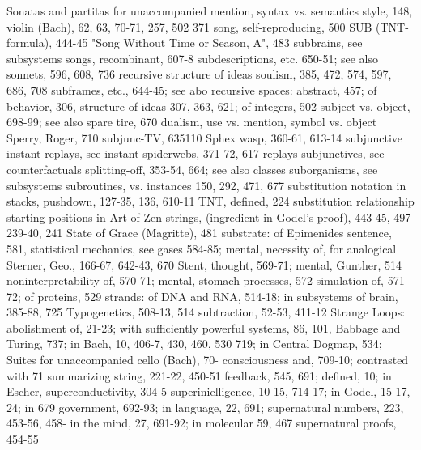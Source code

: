 Sonatas and partitas for unaccompanied          mention, syntax vs. semantics style, 148,
violin (Bach), 62, 63, 70-71, 257, 502          371
song, self-reproducing, 500                     SUB (TNT-formula), 444-45
"Song Without Time or Season, A", 483           subbrains, see subsystems
songs, recombinant, 607-8                       subdescriptions, etc. 650-51; see also
sonnets, 596, 608, 736                          recursive structure of ideas
soulism, 385, 472, 574, 597, 686, 708           subframes, etc., 644-45; see abo recursive
spaces: abstract, 457; of behavior, 306,        structure of ideas
307, 363, 621; of integers, 502                 subject vs. object, 698-99; see also
spare tire, 670                                 dualism, use vs. mention, symbol vs. object
Sperry, Roger, 710                              subjunc-TV, 635110
Sphex wasp, 360-61, 613-14                      subjunctive instant replays, see instant
spiderwebs, 371-72, 617                         replays subjunctives, see counterfactuals
splitting-off, 353-54, 664; see also classes    suborganisms, see subsystems subroutines,
vs. instances                                   150, 292, 471, 677 substitution notation in
stacks, pushdown, 127-35, 136, 610-11           TNT, defined, 224 substitution relationship
starting positions in Art of Zen strings,       (ingredient in Godel's proof), 443-45, 497
239-40, 241
State of Grace (Magritte), 481                  substrate: of Epimenides sentence, 581,
statistical mechanics, see gases                584-85; mental, necessity of, for analogical
Sterner, Geo., 166-67, 642-43, 670 Stent,       thought,            569-71;           mental,
Gunther, 514                                    noninterpretability of, 570-71; mental,
stomach processes, 572                          simulation of, 571-72; of proteins, 529
strands: of DNA and RNA, 514-18; in             subsystems of brain, 385-88, 725
Typogenetics, 508-13, 514                       subtraction, 52-53, 411-12
Strange Loops: abolishment of, 21-23; with      sufficiently powerful systems, 86, 101,
Babbage and Turing, 737; in Bach, 10,           406-7, 430, 460, 530
719;      in    Central    Dogmap,      534;    Suites for unaccompanied cello (Bach), 70-
consciousness and, 709-10; contrasted with      71 summarizing string, 221-22, 450-51
feedback, 545, 691; defined, 10; in Escher,     superconductivity, 304-5 superinielligence,
10-15, 714-17; in Godel, 15-17, 24; in          679
government, 692-93; in language, 22, 691;       supernatural numbers, 223, 453-56, 458-
in the mind, 27, 691-92; in molecular           59, 467 supernatural proofs, 454-55
